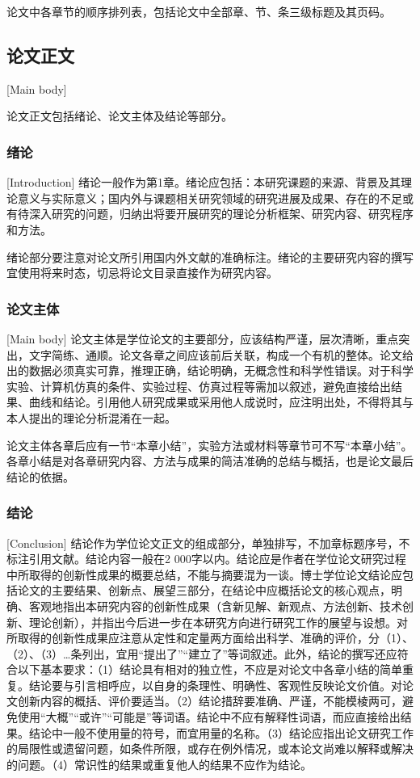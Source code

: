 论文中各章节的顺序排列表，包括论文中全部章、节、条三级标题及其页码。

\subsection{论文正文}[Main body]

论文正文包括绪论、论文主体及结论等部分。

\subsubsection{绪论}[Introduction]
绪论一般作为第1章。绪论应包括：本研究课题的来源、背景及其理论意义与实际意义；国内外与课题相关研究领域的研究进展及成果、存在的不足或有待深入研究的问题，归纳出将要开展研究的理论分析框架、研究内容、研究程序和方法。

绪论部分要注意对论文所引用国内外文献的准确标注。绪论的主要研究内容的撰写宜使用将来时态，切忌将论文目录直接作为研究内容。

\subsubsection{论文主体}[Main body]
论文主体是学位论文的主要部分，应该结构严谨，层次清晰，重点突出，文字简练、通顺。论文各章之间应该前后关联，构成一个有机的整体。论文给出的数据必须真实可靠，推理正确，结论明确，无概念性和科学性错误。对于科学实验、计算机仿真的条件、实验过程、仿真过程等需加以叙述，避免直接给出结果、曲线和结论。引用他人研究成果或采用他人成说时，应注明出处，不得将其与本人提出的理论分析混淆在一起。

论文主体各章后应有一节“本章小结”，实验方法或材料等章节可不写“本章小结”。各章小结是对各章研究内容、方法与成果的简洁准确的总结与概括，也是论文最后结论的依据。

\subsubsection{结论}[Conclusion]
结论作为学位论文正文的组成部分，单独排写，不加章标题序号，不标注引用文献。结论内容一般在2 000字以内。结论应是作者在学位论文研究过程中所取得的创新性成果的概要总结，不能与摘要混为一谈。博士学位论文结论应包括论文的主要结果、创新点、展望三部分，在结论中应概括论文的核心观点，明确、客观地指出本研究内容的创新性成果（含新见解、新观点、方法创新、技术创新、理论创新），并指出今后进一步在本研究方向进行研究工作的展望与设想。对所取得的创新性成果应注意从定性和定量两方面给出科学、准确的评价，分（1）、（2）、（3）…条列出，宜用“提出了”“建立了”等词叙述。此外，结论的撰写还应符合以下基本要求：（1）结论具有相对的独立性，不应是对论文中各章小结的简单重复。结论要与引言相呼应，以自身的条理性、明确性、客观性反映论文价值。对论文创新内容的概括、评价要适当。（2）结论措辞要准确、严谨，不能模棱两可，避免使用“大概”“或许”“可能是”等词语。结论中不应有解释性词语，而应直接给出结果。结论中一般不使用量的符号，而宜用量的名称。（3）结论应指出论文研究工作的局限性或遗留问题，如条件所限，或存在例外情况，或本论文尚难以解释或解决的问题。（4）常识性的结果或重复他人的结果不应作为结论。

